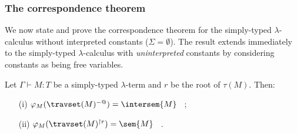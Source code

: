 \subsubsection{The correspondence theorem}
We now state and prove the correspondence theorem for
the simply-typed $\lambda$-calculus without interpreted constants
($\Sigma = \emptyset$). The result extends immediately to the
simply-typed $\lambda$-calculus with \emph{uninterpreted} constants
by considering constants as being free variables.

\begin{proposition}
\label{prop:rel_gamesem_trav} Let $\Gamma \vdash M : T$ be a
simply-typed $\lambda$-term and $r$ be the root of $\tau(M)$. Then:
\begin{itemize}
\item[(i)]  $\varphi_M(\travset(M)^{-@}) = \intersem{M}$ \ ;
\item[(ii)] $\varphi_M(\travset(M)^{\upharpoonright r}) = \sem{M}$ \ .
\end{itemize}
\end{proposition}


